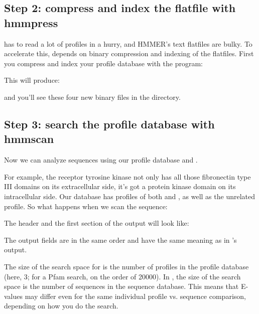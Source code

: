 \subsection{Step 2: compress and index the flatfile with hmmpress}

 has to read a lot of profiles in a hurry, and
HMMER's text flatfiles are bulky. To accelerate this, 
depends on binary compression and indexing of the flatfiles.  First
you compress and index your profile database with the 
program:

   \vspace{1ex}
   \vspace{1ex}

This will produce:


and you'll see these four new binary files in the directory.

\subsection{Step 3: search the profile database with hmmscan}

Now we can analyze sequences using our profile database and
. 

For example, the receptor tyrosine kinase  not only
has all those fibronectin type III domains on its extracellular side,
it's got a protein kinase domain on its intracellular side. Our
 database has profiles of both  and
, as well as the unrelated  profile. So
what happens when we scan the  sequence:

   \vspace{1ex}
   \vspace{1ex}

The header and the first section of the output will look like:


The output fields are in the same order and have the same meaning as
in 's output. 

The size of the search space for  is the number of
profiles in the profile database (here, 3; for a Pfam search, on the order
of 20000). In , the size of the search space is the
number of sequences in the sequence database. This means that E-values
may differ even for the same individual profile vs. sequence
comparison, depending on how you do the search.

